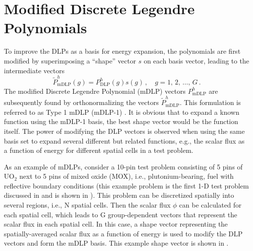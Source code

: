 
\section{Modified Discrete Legendre Polynomials}

To improve the DLPs as a basis for energy expansion, the polynomials are first 
modified by superimposing a ``shape'' vector $s$ on each basis vector, leading 
to the intermediate vectors
\begin{equation}
    \tilde{P}^h_{\text{mDLP}}(g) =  
    P^h_{\text{DLP}}(g) s(g) \,, \quad g = 1,\, 2,\, \ldots ,\, G \, .
\end{equation}
The modified Discrete Legendre Polynomial (mDLP) vectors  $P^h_{\text{mDLP}}$ 
are subsequently found by orthonormalizing the vectors 
$\tilde{P}^h_{\text{mDLP}}$. This formulation is referred to as Type 1 mDLP 
(mDLP-1) \citep{Roberts2014}. It is obvious that to expand a known 
function using the mDLP-1 basis, the best shape vector would be the function 
itself.  The power of 
modifying the DLP vectors is observed when using the same basis set to expand 
several different but related functions, e.g., the scalar flux as a function 
of energy for different spatial cells in a test problem.

As an example of mDLPs, consider a 10-pin test problem consisting of 5 pins of 
UO$_2$ next to 5 pins of mixed oxide (MOX), i.e., plutonium-bearing, fuel with 
reflective boundary 
conditions (this example problem is the first 1-D test problem discussed in 
 and is shown in ).  This 
problem can be discretized spatially into several regions, i.e., N spatial 
cells.  Then the scalar flux $\phi$ can be calculated for 
each spatial cell, which leads to G group-dependent vectors that represent the 
scalar flux in each spatial cell.  In this case, a shape 
vector representing the spatially-averaged scalar flux as a function of energy 
is used to modify the DLP vectors and form the mDLP basis. This example shape 
vector is shown in .


